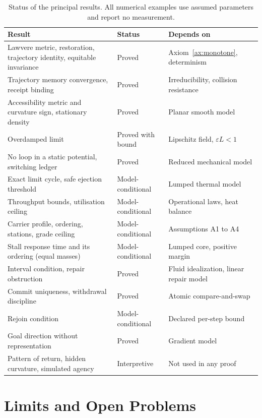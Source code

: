 \documentclass[11pt,openany]{book}
\theoremstyle{plain}
\theoremstyle{definition}
\theoremstyle{remark}
\begin{document}
\begin{table}[t]
\centering
\small
\begin{tabular}{@{}P{5.6cm}P{3.0cm}P{4.0cm}@{}}
\toprule
Result & Status & Depends on \\
\midrule
Lawvere metric, restoration, trajectory identity, equitable invariance & Proved & Axiom~\ref{ax:monotone}, determinism \\
Trajectory memory convergence, receipt binding & Proved & Irreducibility, collision resistance \\
Accessibility metric and curvature sign, stationary density & Proved & Planar smooth model \\
Overdamped limit & Proved with bound & Lipschitz field, $\varepsilon L<1$ \\
No loop in a static potential, switching ledger & Proved & Reduced mechanical model \\
Exact limit cycle, safe ejection threshold & Model-conditional & Lumped thermal model \\
Throughput bounds, utilisation ceiling & Model-conditional & Operational laws, heat balance \\
Carrier profile, ordering, stations, grade ceiling & Model-conditional & Assumptions A1 to A4 \\
Stall response time and its ordering (equal masses) & Model-conditional & Lumped core, positive margin \\
Interval condition, repair obstruction & Proved & Fluid idealization, linear repair model \\
Commit uniqueness, withdrawal discipline & Proved & Atomic compare-and-swap \\
Rejoin condition & Model-conditional & Declared per-step bound \\
Goal direction without representation & Proved & Gradient model \\
Pattern of return, hidden curvature, simulated agency & Interpretive & Not used in any proof \\
\bottomrule
\end{tabular}
\caption{Status of the principal results. All numerical examples use assumed parameters and report no measurement.}
\label{tab:status}
\end{table}

\section{Limits and Open Problems}
\end{document}
